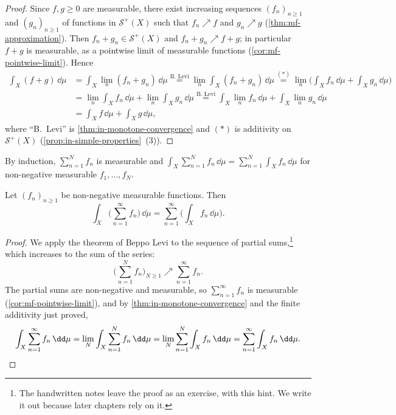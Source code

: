 \begin{proof}
Since $f,g\ge0$ are measurable, there exist increasing sequences $(f_n)_{n\ge1}$ and
$(g_n)_{n\ge1}$ of functions in $\mathcal S^+(X)$ such that $f_n\nearrow f$ and $g_n\nearrow g$
(\cref{thm:mf-approximation}). Then $f_n+g_n\in\mathcal S^+(X)$ and $f_n+g_n\nearrow f+g$; in
particular $f+g$ is measurable, as a pointwise limit of measurable functions
(\cref{cor:mf-pointwise-limit}). Hence
\begin{align*}
  \int_X(f+g)\,\dd\mu&=\int_X\lim_n(f_n+g_n)\,\dd\mu
  \overset{\text{B.~Levi}}{=}\lim_n\int_X(f_n+g_n)\,\dd\mu
  \overset{(*)}{=}\lim_n\Big(\int_Xf_n\,\dd\mu+\int_Xg_n\,\dd\mu\Big)\\
  &=\lim_n\int_Xf_n\,\dd\mu+\lim_n\int_Xg_n\,\dd\mu
  \overset{\text{B.~Levi}}{=}\int_X\lim_nf_n\,\dd\mu+\int_X\lim_ng_n\,\dd\mu\\
  &=\int_Xf\,\dd\mu+\int_Xg\,\dd\mu ,
\end{align*}
where ``B.~Levi'' is \cref{thm:in-monotone-convergence} and $(*)$ is additivity on
$\mathcal S^+(X)$ (\cref{prop:in-simple-properties}~(3)).
\end{proof}

By induction, $\sum_{n=1}^Nf_n$ is measurable and
$\int_X\sum_{n=1}^Nf_n\,\dd\mu=\sum_{n=1}^N\int_Xf_n\,\dd\mu$ for non-negative measurable
$f_1,\dots,f_N$.

\begin{corollary}\label{cor:in-series}
Let $(f_n)_{n\ge1}$ be non-negative measurable functions. Then
\[
  \int_X\Big(\sum_{n=1}^\infty f_n\Big)\,\dd\mu=\sum_{n=1}^\infty\Big(\int_Xf_n\,\dd\mu\Big).
\]
\end{corollary}

\begin{proof}
We apply the theorem of Beppo Levi to the sequence of partial sums,\footnote{The handwritten
notes leave the proof as an exercise, with this hint. We write it out because later chapters
rely on it.} which increases to the sum of the series:
\[
  \Big(\sum_{n=1}^Nf_n\Big)_{N\ge1}\nearrow\sum_{n=1}^\infty f_n .
\]
The partial sums are non-negative and measurable, so $\sum_{n=1}^\infty f_n$ is measurable
(\cref{cor:mf-pointwise-limit}), and by \cref{thm:in-monotone-convergence} and the finite
additivity just proved,
\[
  \int_X\sum_{n=1}^\infty f_n\,\dd\mu=\lim_N\int_X\sum_{n=1}^Nf_n\,\dd\mu
  =\lim_N\sum_{n=1}^N\int_Xf_n\,\dd\mu=\sum_{n=1}^\infty\int_Xf_n\,\dd\mu .\qedhere
\]
\end{proof}

